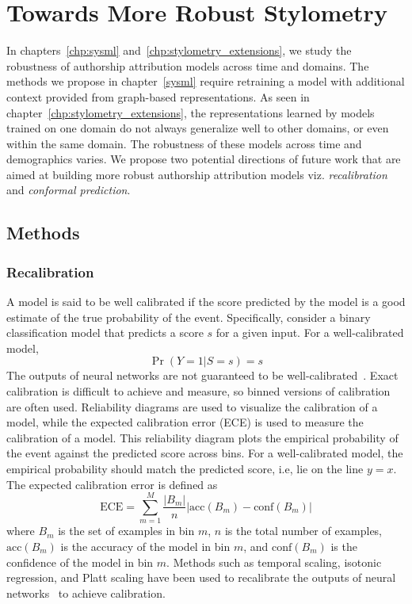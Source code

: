 \section{Towards More Robust Stylometry}

In chapters~\ref{chp:sysml} and~\ref{chp:stylometry_extensions}, we study the robustness of authorship attribution models across time and domains.
The methods we propose in chapter~\ref*{sysml} require retraining a model with additional context provided from graph-based representations.
As seen in chapter~\ref*{chp:stylometry_extensions}, the representations learned by models trained on one domain do not always generalize well to other domains, or even within the same domain.
The robustness of these models across time and demographics varies.
We propose two potential directions of future work that are aimed at building more robust authorship attribution models viz. \emph{recalibration} and \emph{conformal prediction}.

\subsection{Methods}

\subsubsection{Recalibration}
A model is said to be well calibrated if the score predicted by the model is a good estimate of the true probability of the event.
Specifically, consider a binary classification model that predicts a score $s$ for a given input.
For a well-calibrated model, 
\[
    \Pr(Y = 1 | S = s) = s
\]
The outputs of neural networks are not guaranteed to be well-calibrated~\citep{guo2017calibration}.
Exact calibration is difficult to achieve and measure, so binned versions of calibration are often used.
Reliability diagrams are used to visualize the calibration of a model, while the expected calibration error (ECE) is used to measure the calibration of a model.
This reliability diagram plots the empirical probability of the event against the predicted score across bins.
For a well-calibrated model, the empirical probability should match the predicted score, i.e, lie on the line $y = x$.
The expected calibration error is defined as
\[
    \text{ECE} = \sum_{m=1}^{M} \frac{|B_m|}{n} \left| \text{acc}(B_m) - \text{conf}(B_m) \right|
\]
where $B_m$ is the set of examples in bin $m$, $n$ is the total number of examples, $\text{acc}(B_m)$ is the accuracy of the model in bin $m$, and $\text{conf}(B_m)$ is the confidence of the model in bin $m$.
Methods such as temporal scaling, isotonic regression, and Platt scaling have been used to recalibrate the outputs of neural networks~\cite{guo2017calibration} to achieve calibration.

